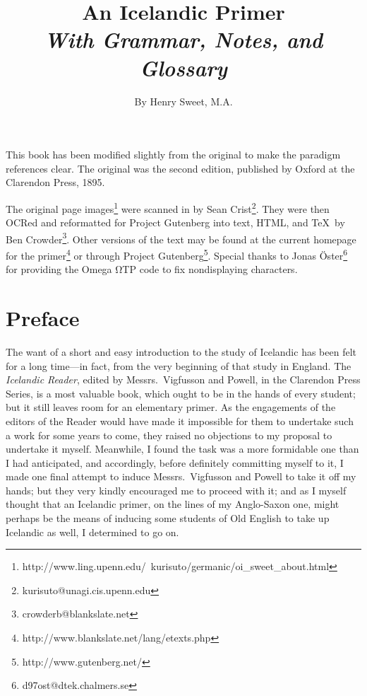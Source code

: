 \documentclass[12pt,letterpaper]{book}
\title{\Huge{An Icelandic Primer}\\
\vspace{\baselineskip}
\Large{\textit{With Grammar, Notes, and Glossary}}}
\date{}
\author{By Henry Sweet, M.A.}
\begin{document}
\frontmatter

\maketitle


\noindent
This book has been modified slightly from the original to make the paradigm
references clear.  The original was the second edition, published by Oxford
at the Clarendon Press, 1895.

\vspace{\baselineskip}
\noindent
The original page
images\footnote{http://www.ling.upenn.edu/~kurisuto/germanic/oi\_sweet\_about.html}
were scanned in by Sean Crist\footnote{kurisuto@unagi.cis.upenn.edu}.  They
were then OCRed and reformatted for Project Gutenberg into text, HTML, and
\TeX\ by Ben Crowder\footnote{crowderb@blankslate.net}.  Other versions of the text
may be found at the current homepage for the
primer\footnote{http://www.blankslate.net/lang/etexts.php} or through Project
Gutenberg\footnote{http://www.gutenberg.net/}.  Special thanks to Jonas
Öster\footnote{d97ost@dtek.chalmers.se} for providing the Omega ΩTP code to fix
nondisplaying characters.

\thispagestyle{empty}


\chapter*{Preface}

The want of a short and easy introduction to the study of
Icelandic has been felt for a long time---in fact, from the very
beginning of that study in England.  The \textit{Icelandic Reader},
edited by Messrs.\ Vigfusson and Powell, in the Clarendon Press
Series, is a most valuable book, which ought to be in the hands
of every student; but it still leaves room for an elementary
primer.  As the engagements of the editors of the Reader would
have made it impossible for them to undertake such a work for
some years to come, they raised no objections to my proposal to
undertake it myself.  Meanwhile, I found the task was a more
formidable one than I had anticipated, and accordingly, before
definitely committing myself to it, I made one final attempt to
induce Messrs.\ Vigfusson and Powell to take it off my hands; but
they very kindly encouraged me to proceed with it; and as I
myself thought that an Icelandic primer, on the lines of my
Anglo-Saxon one, might perhaps be the means of inducing some
students of Old English to take up Icelandic as well, I
determined to go on.
\end{document}

